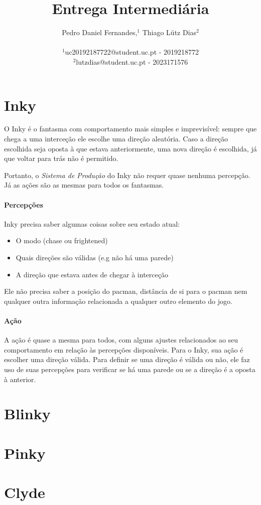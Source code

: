 \documentclass[12pt]{article}
\title{Entrega Intermediária}
\author{
    Pedro Daniel Fernandes,$^{1}$ Thiago Lütz Dias$^{2}$\\
\\
\normalsize{$^{1}$uc20192187722@student.uc.pt - 2019218772}\\
\normalsize{$^{2}$lutzdias@student.uc.pt - 2023171576}\\
}
\date{}
\begin{document}
 

\baselineskip24pt

\maketitle 

\section*{Inky}

O Inky é o fantasma com comportamento mais simples e imprevisível: sempre que
chega a uma interceção ele escolhe uma direção aleatória. Caso a direção
escolhida seja oposta à que estava anteriormente, uma nova direção é escolhida,
já que voltar para trás não é permitido.

Portanto, o \textit{Sistema de Produção} do Inky não requer quase nenhuma
percepção. Já as ações são as mesmas para todos os fantasmas.

\paragraph*{Percepções}
Inky precisa saber algumas coisas sobre seu estado atual:
\begin{itemize}
    \item O modo (chase ou frightened)
    \item Quais direções são válidas (e.g não há uma parede)
    \item A direção que estava antes de chegar à interceção
\end{itemize}
Ele não precisa saber a posição do pacman, distância de si para o pacman nem
qualquer outra informação relacionada a qualquer outro elemento do jogo.

\paragraph*{Ação}
A ação é quase a mesma para todos, com alguns ajustes relacionados ao seu
comportamento em relação às percepções disponíveis. Para o Inky, sua ação é
escolher uma direção válida. Para definir se uma direção é válida ou não, ele
faz uso de suas percepções para verificar se há uma parede ou se a direção é a
oposta à anterior.

\section*{Blinky}

\section*{Pinky}

\section*{Clyde}
\end{document}
